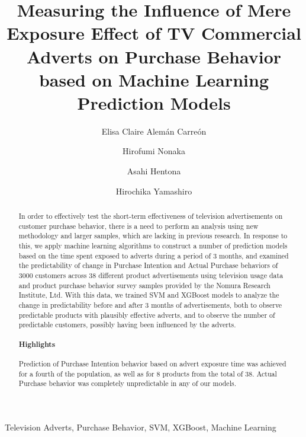 \documentclass[review]{elsarticle}
\begin{document}
\begin{frontmatter}

\title{Measuring the Influence of Mere Exposure Effect of TV Commercial Adverts on Purchase Behavior based on Machine Learning Prediction Models}

\author[gidai]{Elisa Claire Alemán Carreón
}

\author[gidai]{Hirofumi Nonaka}

\author[gidai]{Asahi Hentona}

\author[gidai]{Hirochika Yamashiro}

\address[gidai]{Nagaoka University of Technology, Nagaoka, Japan}




\begin{abstract}

In order to effectively test the short-term effectiveness of television advertisements on customer purchase behavior, there is a need to perform an analysis using new methodology and larger samples, which are lacking in previous research. In response to this, we apply machine learning algorithms to construct a number of prediction models based on the time spent exposed to adverts during a period of 3 months, and examined the predictability of change in Purchase Intention and Actual Purchase behaviors of 3000 customers across 38 different product advertisements using television usage data and product purchase behavior survey samples provided by the Nomura Research Institute, Ltd. With this data, we trained SVM and XGBoost models to analyze the change in predictability before and after 3 months of advertisements, both to observe predictable products with plausibly effective adverts, and to observe the number of predictable customers, possibly having been influenced by the adverts.


\paragraph{Highlights}
Prediction of Purchase Intention behavior based on advert exposure time was achieved for a fourth of the population, as well as for 8 products from the total of 38. Actual Purchase behavior was completely unpredictable in any of our models.
\end{abstract}

\begin{keyword}
Television Adverts\sep
Purchase Behavior\sep
SVM\sep
XGBoost\sep
Machine Learning
\end{keyword}

\end{frontmatter}
\end{document}
